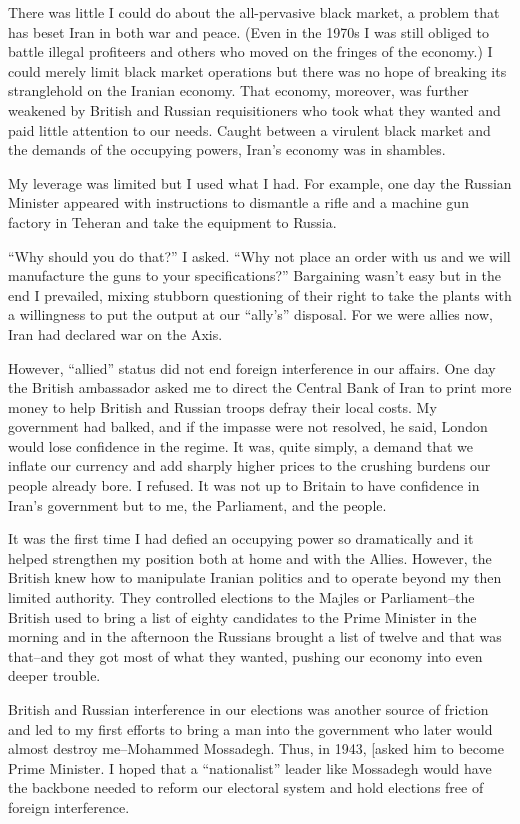 There was little I could do about the all-pervasive black market, a problem that has beset Iran in both war and peace. (Even in the 1970s I was still obliged to battle illegal profiteers and others who moved on the fringes of the economy.) I could merely limit black market operations but there was no hope of breaking its stranglehold on the Iranian economy. That economy, moreover, was further weakened by British and Russian requisitioners who took what they wanted and paid little attention to our needs. Caught between a virulent black market and the demands of the occupying powers, Iran's economy was in shambles. 

My leverage was limited but I used what I had. For example, one day the Russian Minister appeared with instructions to dismantle a rifle and a machine gun factory in Teheran and take the equipment to Russia. 

“Why should you do that?” I asked. “Why not place an order with us and we will manufacture the guns to your specifications?” Bargaining wasn't easy but in the end I prevailed, mixing stubborn questioning of their right to take the plants with a willingness to put the output at our “ally’s” disposal. For we were allies now, Iran had declared war on the Axis. 

However, “allied” status did not end foreign interference in our affairs. One day the British ambassador asked me to direct the Central Bank of Iran to print more money to help British and Russian troops defray their local costs. My government had balked, and if the impasse were not resolved, he said, London would lose confidence in the regime. It was, quite simply, a demand that we inflate our currency and add sharply higher prices to the crushing burdens our people already bore. I refused. It was not up to Britain to have confidence in Iran's government but to me, the Parliament, and the people. 

It was the first time I had defied an occupying power so dramatically and it helped strengthen my position both at home and with the Allies. However, the British knew how to manipulate Iranian politics and to operate beyond my then limited authority. They controlled elections to the Majles or Parliament--the British used to bring a list of eighty candidates to the Prime Minister in the morning and in the afternoon the Russians brought a list of twelve and that was that--and they got most of what they wanted, pushing our economy into even deeper trouble. 

British and Russian interference in our elections was another source of friction and led to my first efforts to bring a man into the government who later would almost destroy me--Mohammed Mossadegh. Thus, in 1943, [asked him to become Prime Minister. I hoped that a “nationalist” leader like Mossadegh would have the backbone needed to reform our electoral system and hold elections free of foreign interference. 

